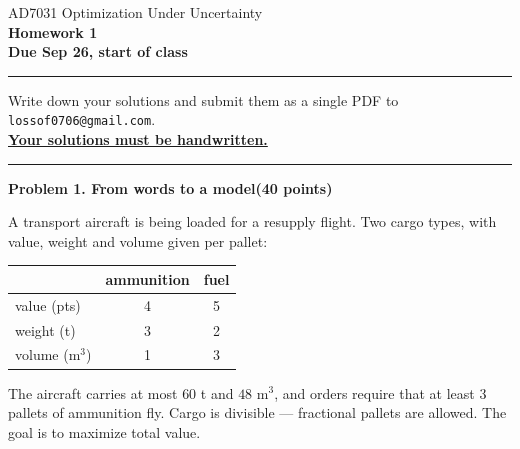 \documentclass[10pt]{article}
\newcommand{\problem}[2]{%
  \par\bigskip
  {\color{ruleink}\rule{\textwidth}{1pt}}\par\nobreak\vspace{3pt}
  {\large\bfseries #2}\hfill{\normalsize\bfseries(#1 points)}\par\nobreak\vspace{4pt}}
\begin{document}
\begin{center}
  {\large AD7031 Optimization Under Uncertainty}\\[3pt]
  {\Large\bfseries Homework 1}\\[4pt]
  {\small \textbf{Due Sep 26, start of class}}
\end{center}
\medskip\hrule\medskip

Write down your solutions and submit them as a single PDF to
\texttt{lossof0706@gmail.com}.\\
\textbf{\underline{Your solutions must be handwritten.}}

\problem{40}{Problem 1. From words to a model}

A transport aircraft is being loaded for a resupply flight. Two cargo types, with value,
weight and volume given per pallet:

\begin{center}
\begin{tabular}{l|cc}
              & ammunition & fuel \\ \hline
 value (pts)  & 4 & 5 \\
 weight (t)   & 3 & 2 \\
 volume (m$^3$) & 1 & 3 \\
\end{tabular}
\end{center}

The aircraft carries at most $60$ t and $48$ m$^3$, and orders require that at least
$3$ pallets of ammunition fly. Cargo is divisible --- fractional pallets are allowed.
The goal is to maximize total value.
\end{document}
